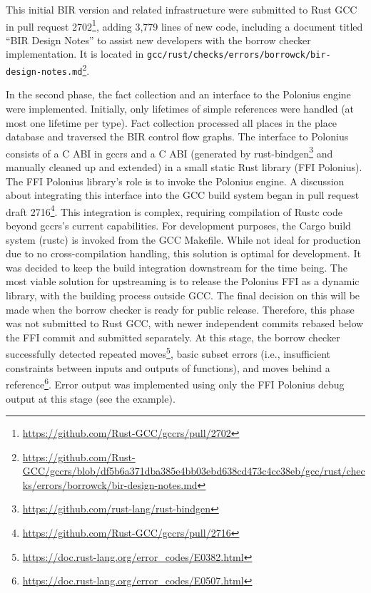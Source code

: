 \documentclass[
  11pt,
  twoside,symmetric]{report}
\DeclareRobustCommand{\href}[2]{#2\footnote{\url{#1}}}
\begin{document}
This initial BIR version and related infrastructure were submitted to
Rust GCC in \href{https://github.com/Rust-GCC/gccrs/pull/2702}{pull
request 2702}, adding 3,779 lines of new code, including a document
titled ``BIR Design Notes'' to assist new developers with the borrow
checker implementation. It is located in
\href{https://github.com/Rust-GCC/gccrs/blob/df5b6a371dba385e4bb03ebd638cd473c4cc38eb/gcc/rust/checks/errors/borrowck/bir-design-notes.md}{\texttt{gcc/rust/checks/errors/borrowck/bir-design-notes.md}}.

In the second phase, the fact collection and an interface to the
Polonius engine were implemented. Initially, only lifetimes of simple
references were handled (at most one lifetime per type). Fact collection
processed all places in the place database and traversed the BIR control
flow graphs. The interface to Polonius consists of a C ABI in gccrs and
a C ABI (generated by
\href{https://github.com/rust-lang/rust-bindgen}{rust-bindgen} and
manually cleaned up and extended) in a small static Rust library (FFI
Polonius). The FFI Polonius library's role is to invoke the Polonius
engine. A discussion about integrating this interface into the GCC build
system began in \href{https://github.com/Rust-GCC/gccrs/pull/2716}{pull
request draft 2716}. This integration is complex, requiring compilation
of Rustc code beyond gccrs's current capabilities. For development
purposes, the Cargo build system (rustc) is invoked from the GCC
Makefile. While not ideal for production due to no cross-compilation
handling, this solution is optimal for development. It was decided to
keep the build integration downstream for the time being. The most
viable solution for upstreaming is to release the Polonius FFI as a
dynamic library, with the building process outside GCC. The final
decision on this will be made when the borrow checker is ready for
public release. Therefore, this phase was not submitted to Rust GCC,
with newer independent commits rebased below the FFI commit and
submitted separately. At this stage, the borrow checker successfully
detected
\href{https://doc.rust-lang.org/error_codes/E0382.html}{repeated moves},
basic subset errors (i.e., insufficient constraints between inputs and
outputs of functions), and
\href{https://doc.rust-lang.org/error_codes/E0507.html}{moves behind a
reference}. Error output was implemented using only the FFI Polonius
debug output at this stage (see the example).
\end{document}
